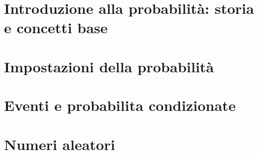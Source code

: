 \documentclass{article}
\begin{document}


\tableofcontents
\restoregeometry

\section{Introduzione alla probabilità: storia e concetti base}


\section{Impostazioni della probabilità}


\section{Eventi e probabilita condizionate}


\section{Numeri aleatori}

\end{document}
